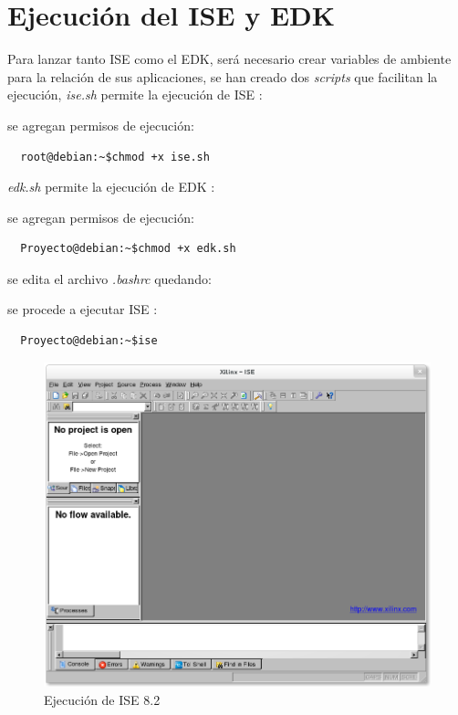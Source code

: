 \section{Ejecución del ISE y EDK}


Para lanzar tanto ISE como el EDK, será necesario crear variables de ambiente
para la relación de sus aplicaciones, se han creado dos  \emph{scripts} que
facilitan la ejecución, \emph{ise.sh} permite la ejecución de ISE :



se agregan permisos de ejecución:

  \begin{verbatim}		
  root@debian:~$chmod +x ise.sh
  \end{verbatim}
 

\emph{edk.sh} permite la ejecución de EDK :



se agregan permisos de ejecución:

  \begin{verbatim}	
  Proyecto@debian:~$chmod +x edk.sh
  \end{verbatim}

 se edita el archivo \emph{.bashrc} quedando:
 
  
 
  
  se procede a ejecutar ISE :
  
    \begin{verbatim}		
  Proyecto@debian:~$ise
  \end{verbatim}
  
    \begin{figure}[ht]
  \begin{center}
 \includegraphics[scale=.40]{./figuras/ise.png}
  \caption{Ejecución de ISE 8.2}
 \label{Ejecución de ISE 8.2}
 \end{center}
\end{figure}

